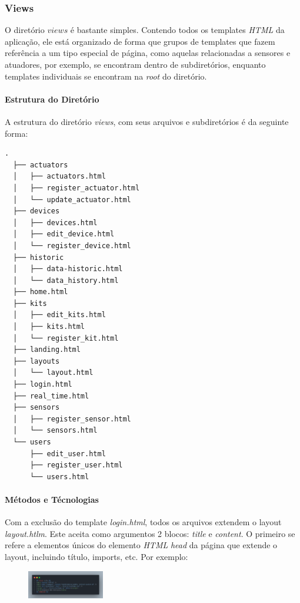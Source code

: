\documentclass[conference, a4paper, 12pt]{IEEEtran}
\begin{document}
\subsubsection{Views}
O diretório $views$ é bastante simples. Contendo todos os templates \emph{HTML} da aplicação, ele está organizado de forma que grupos de templates que fazem referência a um tipo especial de página, como aquelas relacionadas a sensores e atuadores, por exemplo, se encontram dentro de subdiretórios, enquanto templates individuais se encontram na \emph{root} do diretório.

\paragraph{Estrutura do Diretório}
A estrutura do diretório \emph{views}, com seus arquivos e subdiretórios é da seguinte forma:

\begin{lstlisting}[caption=Estrutura do Diretório]
  .
  ├── actuators
  │   ├── actuators.html
  │   ├── register_actuator.html
  │   └── update_actuator.html
  ├── devices
  │   ├── devices.html
  │   ├── edit_device.html
  │   └── register_device.html
  ├── historic
  │   ├── data-historic.html
  │   └── data_history.html
  ├── home.html
  ├── kits
  │   ├── edit_kits.html
  │   ├── kits.html
  │   └── register_kit.html
  ├── landing.html
  ├── layouts
  │   └── layout.html
  ├── login.html
  ├── real_time.html
  ├── sensors
  │   ├── register_sensor.html
  │   └── sensors.html
  └── users
      ├── edit_user.html
      ├── register_user.html
      └── users.html
\end{lstlisting}

      \paragraph{Métodos e Técnologias}
      Com a exclusão do template \emph{login.html}, todos os arquivos extendem o layout \emph{layout.htlm}. Este aceita como argumentos 2 blocos: \emph{title} e \emph{content}. O primeiro se refere a elementos únicos do elemento \emph{HTML} \emph{head} da página que extende o layout, incluindo título, imports, etc. Por exemplo:

      \begin{figure}[h]
        \begin{center}
          \includegraphics[width=0.30\textwidth]{title-block.png}
        \end{center}
      \end{figure}
\end{document}
